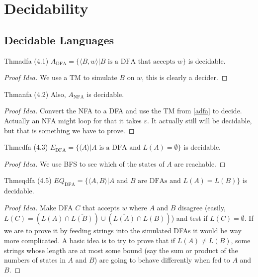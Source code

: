 \chapter{Decidability}

\section{Decidable Languages}

\begin{reference}{Thm}{adfa}
  (4.1) $A_{\mathrm{DFA}}=\{\langle B, w\rangle|B\text{ is a DFA that accepts }w\}$ is decidable.
\end{reference}

\begin{proof}[Proof Idea]
  We use a TM to simulate $B$ on $w$, this is clearly a decider.
\end{proof}

\begin{reference}{Thm}{anfa}
  (4.2) Also, $A_{\mathrm{NFA}}$ is decidable.
\end{reference}

\begin{proof}[Proof Idea]
  Convert the NFA to a DFA and use the TM from \ref{adfa} to decide. Actually an NFA might loop for that it takes $\varepsilon$. It actually still will be decidable, but that is something we have to prove.
\end{proof}

\begin{reference}{Thm}{edfa}
  (4.3) $E_{\mathrm{DFA}}=\{\langle A\rangle|A\text{ is a DFA and }L(A)=\emptyset\}$ is decidable.
\end{reference}

\begin{proof}[Proof Idea]
  We use BFS to see which of the states of $A$ are reachable.
\end{proof}

\begin{reference}{Thm}{eqdfa}
  (4.5) $EQ_{\mathrm{DFA}}=\{\langle A,B\rangle|A\text{ and }B\text{ are DFAs and }L(A)=L(B)\}$ is decidable.
\end{reference}

\begin{proof}[Proof Idea]
  Make DFA $C$ that accepts $w$ where $A$ and $B$ disagree (easily, $L(C)=(L(A)\cap \overline{L(B)})\cup(\overline{L(A)}\cap L(B))$) and test if $L(C)=\emptyset$. If we are to prove it by feeding strings into the simulated DFAs it would be way more complicated. A basic idea is to try to prove that if $L(A)\neq L(B)$, some strings whose length are at most some bound (say the sum or product of the numbers of states in $A$ and $B$) are going to behave differently when fed to $A$ and $B$.
\end{proof}

